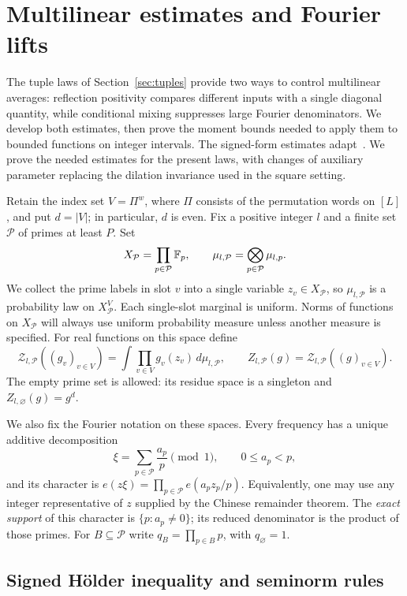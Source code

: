 \section{Multilinear estimates and Fourier lifts}
\label{sec:lifts}

The tuple laws of Section~\ref{sec:tuples} provide two ways to control
multilinear averages: reflection positivity compares different inputs
with a single diagonal quantity, while conditional mixing suppresses
large Fourier denominators.  We develop both estimates, then prove the
moment bounds needed to apply them to bounded functions on integer
intervals.  The signed-form estimates adapt~\cite[Proposition~4.1 and
Lemmas~4.2--4.3]{squarepower}.  We prove the needed estimates for the
present laws, with changes of auxiliary parameter replacing the dilation
invariance used in the square setting.

Retain the index set \(V=\Pi^w\), where \(\Pi\) consists of the
permutation words on \([L]\), and put \(d=|V|\); in particular, \(d\) is even.
Fix a positive integer
\(l\) and a finite set \(\mathcal P\) of primes at least \(P\).  Set
\[
 X_{\mathcal P}=\prod_{p\in\mathcal P}\mathbb F_p,
 \qquad
 \mu_{l,\mathcal P}=\bigotimes_{p\in\mathcal P}\mu_{l,p}.
\]
We collect the prime labels in slot \(v\) into a single variable
\(z_v\in X_{\mathcal P}\), so \(\mu_{l,\mathcal P}\) is a probability
law on \(X_{\mathcal P}^V\).  Each single-slot marginal is uniform.
Norms of functions on \(X_{\mathcal P}\) will always use uniform
probability measure unless another measure is specified.
For real functions on this space define
\[
 \mathcal Z_{l,\mathcal P}((g_v)_{v\in V})
 =\int\prod_{v\in V}g_v(z_v)\,d\mu_{l,\mathcal P},
 \qquad
 Z_{l,\mathcal P}(g)=\mathcal Z_{l,\mathcal P}((g)_{v\in V}).
\]
The empty prime set is allowed: its residue space is a singleton and
\(Z_{l,\varnothing}(g)=g^d\).

We also fix the Fourier notation on these spaces.  Every frequency has a
unique additive decomposition
\[
 \xi=\sum_{p\in\mathcal P}\frac{a_p}{p}\pmod 1,
 \qquad 0\le a_p<p,
\]
and its character is
\(e(z\xi)=\prod_{p\in\mathcal P}e(a_pz_p/p)\).
Equivalently, one may use any integer representative of \(z\) supplied
by the Chinese remainder theorem.  The \emph{exact support} of this
character is \(\{p:a_p\ne0\}\); its reduced denominator is the product
of those primes.  For \(B\subseteq\mathcal P\) write
\(q_B=\prod_{p\in B}p\), with \(q_\varnothing=1\).

\subsection{Signed H\"older inequality and seminorm rules}

